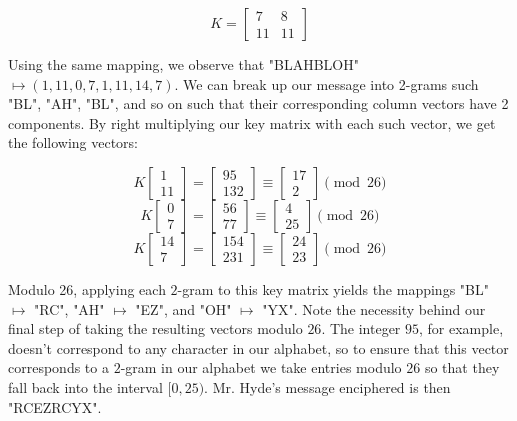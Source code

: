 \documentclass{paper}
\begin{document}
\[ K = \begin{bmatrix}
            7 & 8 \\
            11 & 11
       \end{bmatrix} \]
       
Using the same mapping, we observe that "BLAHBLOH" $\mapsto (1, 11, 0, 7, 1, 11, 14, 7)$. We can break up our message into 2-grams such "BL", "AH", "BL", and so on such that their corresponding column vectors have 2 components. By right multiplying our key matrix with each such vector, we get the following vectors:

\[ K\begin{bmatrix} 1 \\ 11 \end{bmatrix} = \begin{bmatrix} 95 \\ 132 \end{bmatrix} \equiv \begin{bmatrix} 17 \\ 2 \end{bmatrix} \pmod{26} \]
\[ K\begin{bmatrix} 0 \\ 7 \end{bmatrix} = \begin{bmatrix} 56 \\ 77 \end{bmatrix} \equiv \begin{bmatrix} 4 \\ 25 \end{bmatrix} \pmod{26} \]
\[ K\begin{bmatrix} 14 \\ 7 \end{bmatrix} = \begin{bmatrix} 154 \\ 231 \end{bmatrix} \equiv \begin{bmatrix} 24 \\ 23 \end{bmatrix} \pmod{26} \]

Modulo 26, applying each $2$-gram to this key matrix yields the mappings "BL" $\mapsto$ "RC", "AH" $\mapsto$ "EZ", and "OH" $\mapsto$ "YX". Note the necessity behind our final step of taking the resulting vectors modulo $26$. The integer $95$, for example, doesn't correspond to any character in our alphabet, so to ensure that this vector corresponds to a $2$-gram in our alphabet we take entries modulo $26$ so that they fall back into the interval $[0, 25)$. Mr. Hyde's message enciphered is then "RCEZRCYX".
\end{document}
